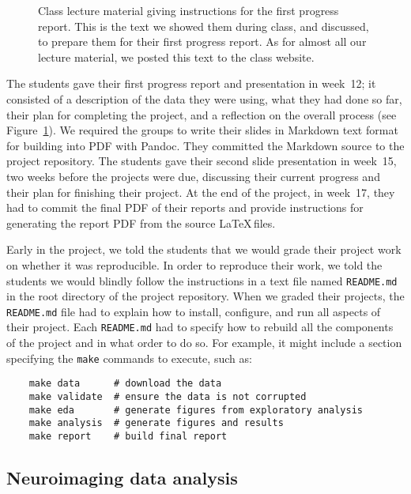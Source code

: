 \begin{figure}
\centering
\begin{tiny}

\end{tiny}
\caption{Class lecture material giving instructions for the first progress
    report.  This is the text we showed them during class, and discussed, to
    prepare them for their first progress report.  As for almost all our
    lecture material, we posted this text to the class website.}
\label{fig:progress}
\end{figure}


The students gave their first progress report and presentation in week~12;
it consisted of a description of the data they were using, what they had done
so far, their plan for completing the project, and a reflection on the overall
process (see Figure~\ref{fig:progress}).
We required the groups to write their slides in Markdown text format for
building into PDF with Pandoc.  They committed the Markdown source to the
project repository.
The students gave their second slide presentation in week~15, two weeks before
the projects were due, discussing their current progress and their plan for
finishing their project.
At the end of the project, in week~17, they had to commit the final PDF of
their reports and provide instructions for generating the report PDF
from the source \LaTeX\,files.

Early in the project, we told the students that we would grade their project
work on whether it was reproducible.  In order to reproduce their work, we
told the students we would blindly follow the instructions in a text file
named \texttt{README.md} in the root directory of the project repository.
When we graded their projects, the \texttt{README.md} file had to explain how
to install, configure, and run all aspects of their project.
Each \texttt{README.md} had to specify how to rebuild all the components of
the project and in what order to do so.
For example, it might include a section specifying
the \texttt{make} commands to execute, such as:
\begin{verbatim}
    make data      # download the data
    make validate  # ensure the data is not corrupted
    make eda       # generate figures from exploratory analysis
    make analysis  # generate figures and results
    make report    # build final report
\end{verbatim}

\subsection{Neuroimaging data analysis}\label{analysis}

